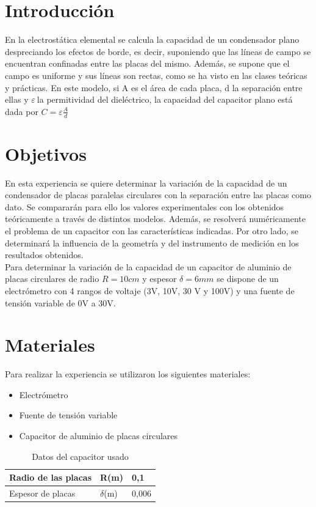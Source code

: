 \documentclass{article}
\begin{document}
\section{Introducción}

En la electrostática elemental se calcula la capacidad de un condensador
plano despreciando los efectos de borde, es decir, suponiendo que las 
líneas de campo se encuentran confinadas entre las placas del mismo. 
Además, se supone que el campo es uniforme y sus líneas son rectas, como se 
ha visto en las clases teóricas y prácticas. En este modelo, si A es 
el área de cada placa, d la separación entre ellas y $ \varepsilon\ $la permitividad del dieléctrico, la capacidad del capacitor plano está dada por $C = \varepsilon\frac{A}{d}$

\section{Objetivos}

En esta experiencia se quiere determinar la variación de la capacidad de 
un condensador de placas paralelas circulares con la separación entre las 
placas como dato. Se compararán para ello los valores experimentales con los 
obtenidos teóricamente a través de distintos modelos. Además, se resolverá numéricamente el problema de un capacitor 
con las características indicadas. Por otro lado, se determinará la 
influencia de la geometría y del instrumento de medición en los resultados 
obtenidos. \\
Para determinar la variación de la 
capacidad de un capacitor de aluminio de placas circulares de radio $R=10 
cm$ y espesor $\delta =6 mm$ se dispone de un electrómetro con 4 rangos de 
voltaje (3V, 10V, 30 V y 100V) y una fuente de tensión variable de 0V a 
30V.

\section{Materiales}

Para realizar la experiencia se utilizaron los siguientes materiales:
\begin{itemize}
	\item Electrómetro
    \item Fuente de tensión variable
    \item Capacitor de aluminio de placas circulares
\end{itemize}
    
    \begin{table}[H]
    \centering
    \begin{tabular}{|l|l|l|}
        \hline
         Radio de las placas	&R(m)	&0,1\\ \hline
         Espesor de placas	&$\delta$(m)	&0,006\\
         \hline
    \end{tabular}
    \caption{Datos del capacitor usado}
    \end{table}
    
\end{document}
